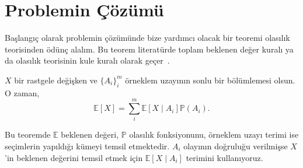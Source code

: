 \section{Problemin \c{C}\"{o}z\"{u}m\"{u}}
\label{sec:solution}

Ba\c{s}lang{\i}\c{c} olarak problemin \c{c}\"{o}z\"{u}m\"{u}nde bize
yard{\i}mc{\i} olacak bir teoremi olas{\i}l{\i}k teorisinden \"{o}d\"{u}n\c{c}
alal{\i}m. Bu teorem literat\"{u}rde toplam beklenen de\u{g}er kural{\i} ya da
olas{\i}l{\i}k teorisinin kule kural{\i} olarak
ge\c{c}er~\cite{bertsekas2002introduction}.

\begin{thm} \label{thm:kule}
    $X$ bir rastgele de\u{g}i\c{s}ken ve $\{A_i\}_i^m$ \"{o}rneklem
    uzay{\i}n{\i}n sonlu bir b\"{o}l\"{u}mlemesi olsun. O zaman, 
    \[ \mathbb{E}[X] = \sum_i^m \mathbb{E}\left[ X \mid A_i \right]
    \mathbb{P}(A_i). \]
\end{thm}
%
\noindent Bu teoremde $\mathbb{E}$ beklenen de\u{g}eri, $\mathbb{P}$
olas{\i}l{\i}k fonksiyonunu, \"{o}rneklem uzay{\i} terimi ise se\c{c}imlerin
yap{\i}ld{\i}\u{g}{\i} k\"{u}meyi temsil etmektedir. $A_i$ olay{\i}n{\i}n
do\u{g}rulu\u{g}u verilmi\c{s}se $X$'in beklenen de\u{g}erini temsil etmek
i\c{c}in $\mathbb{E}\left[ X \mid A_i \right]$ terimini kullan{\i}yoruz.

